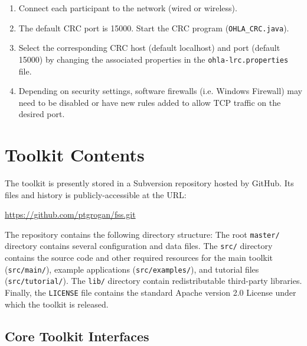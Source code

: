 \documentclass[]{article}
\begin{document}
\begin{enumerate}
\item Connect each participant to the network (wired or wireless).
\item The default CRC port is 15000. Start the CRC program (\texttt{OHLA\_CRC.java}). %
\item Select the corresponding CRC host (default localhost) and port (default 15000) by changing the associated properties in the \texttt{ohla-lrc.properties} file.
\item Depending on security settings, software firewalls (i.e. Windows Firewall) may need to be disabled or have new rules added to allow TCP traffic on the desired port.
\end{enumerate}

\section{Toolkit Contents}

The toolkit is presently stored in a Subversion repository hosted by GitHub. Its files and history is publicly-accessible at the URL:
\begin{center}
\url{https://github.com/ptgrogan/fss.git}
\end{center}

The repository contains the following directory structure:
The root \texttt{master/} directory contains several configuration and data files. The \texttt{src/} directory contains the source code and other required resources for the main toolkit (\texttt{src/main/}), example applications (\texttt{src/examples/}), and tutorial files (\texttt{src/tutorial/}). The \texttt{lib/} directory contain redistributable third-party libraries. Finally, the \texttt{LICENSE} file contains the standard Apache version 2.0 License under which the toolkit is released.

\subsection{Core Toolkit Interfaces}
\end{document}
